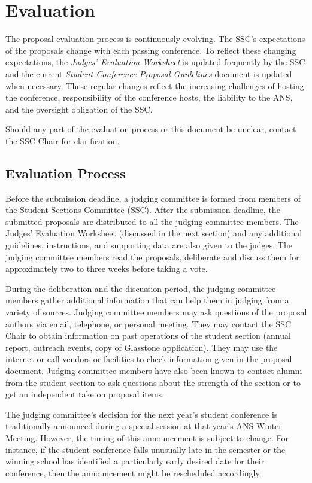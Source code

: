\documentclass[12pt]{article}
\begin{document}
\newpage
\section{Evaluation} \label{sec:Eval}
The proposal evaluation process is continuously evolving. The SSC’s expectations of the proposals change with each passing conference. To reflect these changing expectations, the \textit{Judges’ Evaluation Worksheet} is updated frequently by the SSC and the current \textit{Student Conference Proposal Guidelines} document is updated when necessary. 
These regular changes reflect the increasing challenges of hosting the conference, responsibility of the conference hosts, the liability to the ANS, and the oversight obligation of the SSC.

Should any part of the evaluation process or this document be unclear, contact the \href{mailto:sscChair@gmail.com}{SSC Chair} for clarification.

\subsection{Evaluation Process}
Before the submission deadline, a judging committee is formed from members of the
Student Sections Committee (SSC). After the submission deadline, the submitted
proposals are distributed to all the judging committee members. The Judges’ Evaluation
Worksheet (discussed in the next section) and any additional guidelines, instructions, and supporting data are also given to the judges. The judging committee members read the proposals, deliberate and discuss them for approximately two to three weeks before
taking a vote.

During the deliberation and the discussion period, the judging committee members gather additional information that can help them in judging from a variety of sources.
Judging committee members may ask questions of the proposal authors via email, telephone, or personal meeting. 
They may contact the SSC Chair to obtain information on past operations of the student section (annual report, outreach events, copy of Glasstone application). They may use the internet or call vendors or facilities to check information given in the proposal document. Judging committee members have also been known to contact alumni from the student section to ask questions about the strength of the section or to get an independent take on proposal items.

The judging committee’s decision for the next year's student conference is traditionally announced during a special session at that year's ANS Winter Meeting.
However, the timing of this announcement is subject to change. For instance, if the student conference falls unusually late in the semester or the winning school has identified a particularly early desired date for their conference, then the announcement might be rescheduled accordingly.
\end{document}
